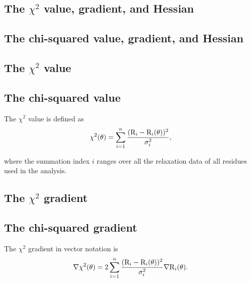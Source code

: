 \begin{latexonly}
    \section{The $\chi^2$ value, gradient, and Hessian}
\end{latexonly}
\begin{htmlonly}
    \section{The chi-squared value, gradient, and Hessian}
\end{htmlonly}

\begin{latexonly}
    \subsection{The $\chi^2$ value}
\end{latexonly}
\begin{htmlonly}
    \subsection{The chi-squared value}
\end{htmlonly}

The $\chi^2$ value is defined as
\begin{equation} \label{eq: maths: chi-squared}
 \chi^2(\theta) = \sum_{i=1}^n \frac{(\mathrm{R}_i - \mathrm{R}_i(\theta))^2}{\sigma_i^2},
\end{equation}

\noindent where the summation index $i$ ranges over all the relaxation data of all residues used in the analysis.



\begin{latexonly}
    \subsection{The $\chi^2$ gradient}
\end{latexonly}
\begin{htmlonly}
    \subsection{The chi-squared gradient}
\end{htmlonly}

The $\chi^2$ gradient in vector notation is
\begin{equation}
 \nabla \chi^2(\theta) = 2 \sum_{i=1}^n \frac{(\mathrm{R}_i - \mathrm{R}_i(\theta))^2}{\sigma_i^2} \nabla \mathrm{R}_i(\theta).
\end{equation}



